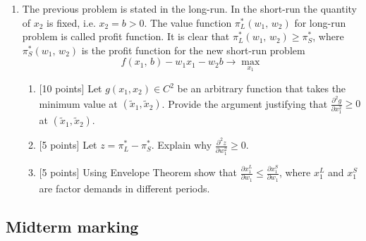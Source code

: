 \documentclass[12pt]{article} %
\theoremstyle{definition} %
\begin{document}
\begin{enumerate}
\item The previous problem is stated in the long-run. In the short-run the quantity of ${x_2}$ is fixed, i.e. ${x_2} = b > 0$. The value function $\pi _L^*({w_1},\,{w_2})$ for long-run problem is called profit function. It is clear that $\pi_L^*({w_1},\,{w_2}) \geqslant \pi _S^*$, where $\pi_S^*({w_1},\,{w_2})$  is the profit function for the new short-run problem
\[
f({x_1},\,b) - {w_1}{x_1} - {w_2}b \to \max_{x_1}
\]
\begin{enumerate}
  \item {[10 points]} Let $g({x_1}, {x_2}) \in {C^2}$ be an arbitrary function that takes the minimum value at $({\tilde x_1}, {\tilde x_2})$. Provide the argument justifying that $\frac{{{\partial ^2}g}}{{\partial x_1^2}} \geqslant 0$ at $({\tilde x_1}, {\tilde x_2})$.
  \item {[5 points]} Let $z = \pi _L^* - \pi _S^*$. Explain why $\frac{{{\partial ^2}z}}{{\partial w_1^2}} \geqslant 0$.
  \item {[5 points]} Using Envelope Theorem show that $\frac{{\partial x_1^L}}{{\partial {w_1}}} \leqslant \frac{{\partial x_1^S}}{{\partial {w_1}}}$, where $x_1^L$ and $x_1^S$ are factor demands in different periods.
\end{enumerate}

\end{enumerate}

\subsection{Midterm marking}
\end{document}
